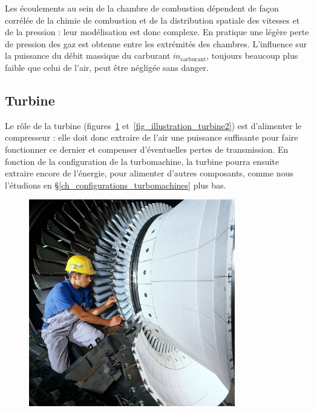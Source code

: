 		Les écoulements au sein de la chambre de combustion dépendent de façon corrélée de la chimie de combustion et de la distribution spatiale des vitesses et de la pression : leur modélisation est donc complexe. En pratique une légère perte de pression des gaz est obtenue entre les extrémités des chambres. L’influence sur la puissance du débit massique du carburant $\dot m_\text{carburant}$, toujours beaucoup plus faible que celui de l’air, peut être négligée sans danger.


	\subsection{Turbine}

		Le rôle de la turbine (figures~\ref{fig_illustration_turbine1} et~\ref{fig_illustration_turbine2}) est d’alimenter le compresseur : elle doit donc extraire de l’air une puissance suffisante pour faire fonctionner ce dernier et compenser d’éventuelles pertes de transmission. En fonction de la configuration de la turbomachine, la turbine pourra ensuite extraire encore de l’énergie, pour alimenter d’autres composants, comme nous l’étudions en \S\ref{ch_configurations_turbomachines} plus bas.

		\begin{figure}
			\begin{center}
				\includegraphics[width=9cm]{images/photo_turbine.jpg}%
			\end{center}
			\label{fig_illustration_turbine1}
		\end{figure}

